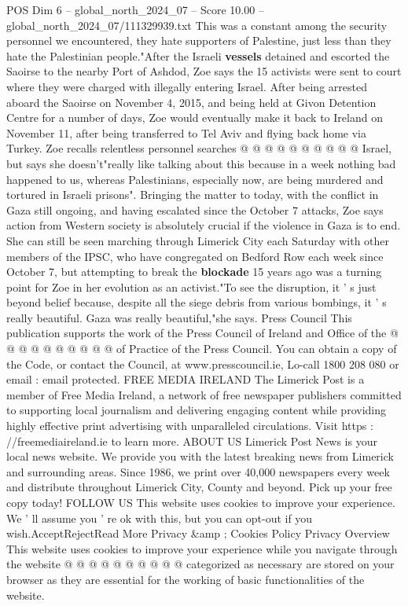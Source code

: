 \begin{textsample}{POS Dim 6 – global\_north\_2024\_07 – Score 10.00 – global\_north\_2024\_07/111329939.txt}
This was a constant among the security personnel we encountered, they hate supporters of Palestine, just less than they hate the Palestinian people."After the Israeli \textbf{vessels} detained and escorted the Saoirse to the nearby Port of Ashdod, Zoe says the 15 activists were sent to court where they were charged with illegally entering Israel.
After being arrested aboard the Saoirse on November 4, 2015, and being held at Givon Detention Centre for a number of days, Zoe would eventually make it back to Ireland on November 11, after being transferred to Tel Aviv and flying back home via Turkey.
Zoe recalls relentless personnel searches @ @ @ @ @ @ @ @ @ @ Israel, but says she doesn't"really like talking about this because in a week nothing bad happened to us, whereas Palestinians, especially now, are being murdered and tortured in Israeli prisons".
Bringing the matter to today, with the conflict in Gaza still ongoing, and having escalated since the October 7 attacks, Zoe says action from Western society is absolutely crucial if the violence in Gaza is to end.
She can still be seen marching through Limerick City each Saturday with other members of the IPSC, who have congregated on Bedford Row each week since October 7, but attempting to break the \textbf{blockade} 15 years ago was a turning point for Zoe in her evolution as an activist."To see the disruption, it ' s just beyond belief because, despite all the siege debris from various bombings, it ' s really beautiful.
Gaza was really beautiful,"she says.
Press Council This publication supports the work of the Press Council of Ireland and Office of the @ @ @ @ @ @ @ @ @ @ of Practice of the Press Council.
You can obtain a copy of the Code, or contact the Council, at www.presscouncil.ie, Lo-call 1800 208 080 or email : email protected.
FREE MEDIA IRELAND The Limerick Post is a member of Free Media Ireland, a network of free newspaper publishers committed to supporting local journalism and delivering engaging content while providing highly effective print advertising with unparalleled circulations.
Visit https : //freemediaireland.ie to learn more.
ABOUT US Limerick Post News is your local news website.
We provide you with the latest breaking news from Limerick and surrounding areas.
Since 1986, we print over 40,000 newspapers every week and distribute throughout Limerick City, County and beyond.
Pick up your free copy today!
FOLLOW US This website uses cookies to improve your experience.
We ' ll assume you ' re ok with this, but you can opt-out if you wish.AcceptRejectRead More Privacy \&amp ; Cookies Policy Privacy Overview This website uses cookies to improve your experience while you navigate through the website @ @ @ @ @ @ @ @ @ @ categorized as necessary are stored on your browser as they are essential for the working of basic functionalities of the website.

\end{textsample}
